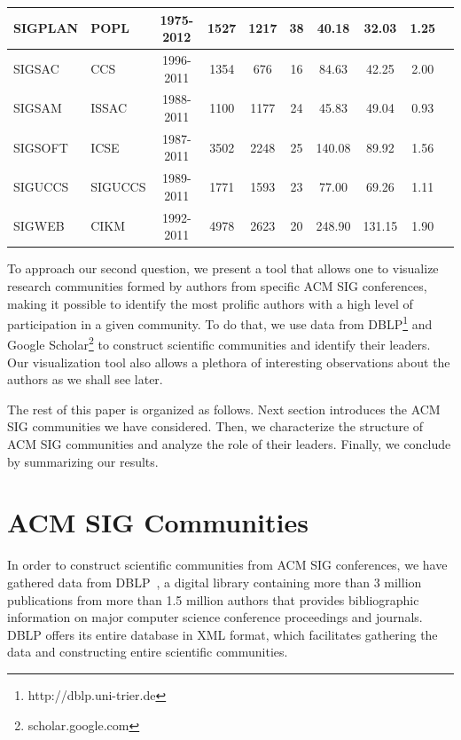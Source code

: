 \documentclass{sig-alternate-10pt}
\begin{document}
\begin{table}[t]
\begin{scriptsize}
\begin{tabular}{|l|l|c|c|c|c|c|c|c|c|}
SIGPLAN & POPL & 1975-2012 & 1527 & 1217 & 38 & 40.18 & 32.03 & 1.25\\ \hline
SIGSAC & CCS & 1996-2011 & 1354 & 676 & 16 & 84.63 & 42.25 & 2.00\\ \hline
SIGSAM & ISSAC & 1988-2011 & 1100 & 1177 & 24 & 45.83 & 49.04 & 0.93\\ \hline
SIGSOFT & ICSE & 1987-2011 & 3502 & 2248 & 25 & 140.08 & 89.92 & 1.56\\ \hline
SIGUCCS & SIGUCCS & 1989-2011 & 1771 & 1593 & 23 & 77.00 & 69.26 & 1.11\\ \hline
SIGWEB & CIKM & 1992-2011 & 4978 & 2623 & 20 & 248.90 & 131.15 & 1.90\\ \hline
\end{tabular}
\end{scriptsize}
\label{tab:sigs_conference_period}
\end{table}


To approach our second question, we present a tool that allows one to visualize research communities formed by authors from specific ACM SIG conferences, making it possible to identify the most prolific authors with a high level of participation in a given community. To do that, we use data from DBLP\footnote{http://dblp.uni-trier.de} and Google Scholar\footnote{scholar.google.com} to construct scientific communities and identify their leaders. Our visualization tool also allows a plethora of interesting observations about the authors as we shall see later.


The rest of this paper is organized as follows. Next section introduces the ACM SIG communities we have considered. Then, we characterize the structure of ACM SIG communities and analyze the role of their leaders. Finally,  we conclude by summarizing our results.




\section{ACM SIG Communities}

In order to construct scientific communities from ACM SIG conferences, we have gathered data from DBLP~\cite{Ley:2002,Ley:2009}, a digital library containing more than 3 million publications from more than 1.5 million authors that provides bibliographic information on major computer science conference proceedings and journals. DBLP offers its entire database in XML format, which facilitates gathering the data and constructing entire scientific communities.
\end{document}
